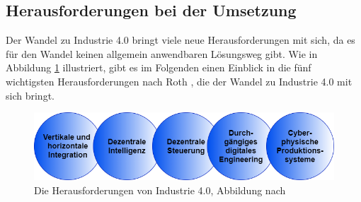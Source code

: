 \subsection{Herausforderungen bei der Umsetzung}\label{sec:HerausforderungenUmsetzung}
Der Wandel zu Industrie 4.0 bringt viele neue Herausforderungen mit sich, da es für den Wandel keinen allgemein anwendbaren Lösungsweg gibt. Wie in Abbildung \ref{fig:HerausforderungenIndustrie4.0} illustriert, gibt es im Folgenden einen Einblick in die fünf wichtigsten Herausforderungen nach Roth \cite{14}, die der Wandel zu Industrie 4.0 mit sich bringt.
\begin{figure}[h]
	\centering
	\includegraphics[width=1\linewidth]{Bilder/A11_HerausforderungenIndustrie4}
	\caption{Die Herausforderungen von Industrie 4.0, Abbildung nach \cite[S.37]{14}}
	\label{fig:HerausforderungenIndustrie4.0}
\end{figure}
\newpage

